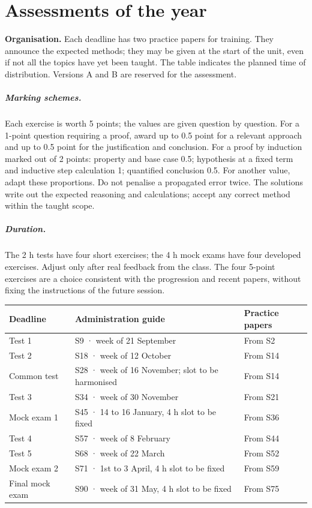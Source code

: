 \chapter{Assessments of the year}
\textbf{Organisation.} Each deadline has two practice papers for training. They announce the expected methods; they may be given at the start of the unit, even if not all the topics have yet been taught. The table indicates the planned time of distribution. Versions A and B are reserved for the assessment.
\ifprof
\paragraph{Marking schemes.} Each exercise is worth 5 points; the values are given question by question. For a 1-point question requiring a proof, award up to 0.5 point for a relevant approach and up to 0.5 point for the justification and conclusion. For a proof by induction marked out of 2 points: property and base case 0.5; hypothesis at a fixed term and inductive step calculation 1; quantified conclusion 0.5. For another value, adapt these proportions. Do not penalise a propagated error twice. The solutions write out the expected reasoning and calculations; accept any correct method within the taught scope.
\paragraph{Duration.} The 2 h tests have four short exercises; the 4 h mock exams have four developed exercises. Adjust only after real feedback from the class. The four 5-point exercises are a choice consistent with the progression and recent papers, without fixing the instructions of the future session.
\fi
\begin{longtable}{@{}p{}p{}p{}@{}}\toprule\textbf{Deadline}&\textbf{Administration guide}&\textbf{Practice papers}\\\midrule\endhead


Test 1&S9 · week of 21 September&From S2\\[3pt]

Test 2&S18 · week of 12 October&From S14\\[3pt]

Common test&S28 · week of 16 November; slot to be harmonised&From S14\\[3pt]

Test 3&S34 · week of 30 November&From S21\\[3pt]

Mock exam 1&S45 · 14 to 16 January, 4 h slot to be fixed&From S36\\[3pt]

Test 4&S57 · week of 8 February&From S44\\[3pt]

Test 5&S68 · week of 22 March&From S52\\[3pt]

Mock exam 2&S71 · 1st to 3 April, 4 h slot to be fixed&From S59\\[3pt]

Final mock exam&S90 · week of 31 May, 4 h slot to be fixed&From S75\\[3pt]

\bottomrule\end{longtable}
